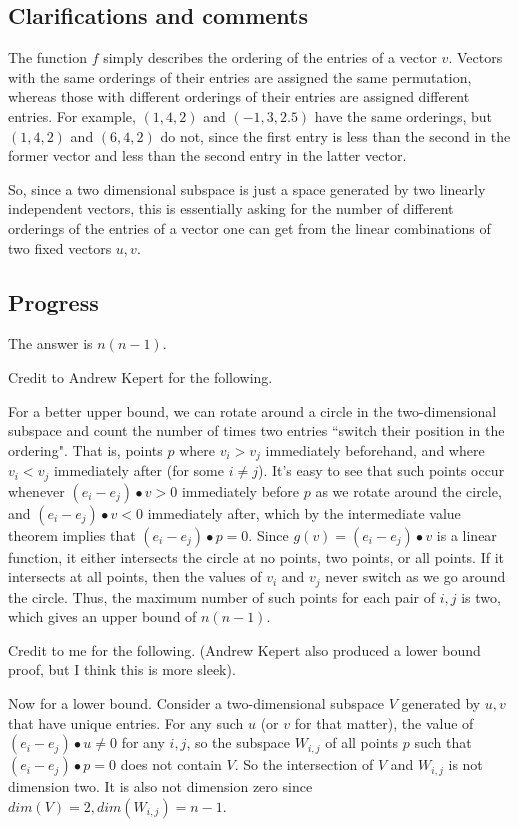 \documentclass[10pt]{article}
\begin{document}
\subsection{Clarifications and comments}

The function $f$ simply describes the ordering of the entries of a vector $v$. Vectors with the same orderings of their entries are assigned the same permutation, whereas those with different orderings of their entries are assigned different entries. For example, $(1,4,2)$ and $(-1,3,2.5)$ have the same orderings, but $(1,4,2)$ and $(6,4,2)$ do not, since the first entry is less than the second in the former vector and less than the second entry in the latter vector.

So, since a two dimensional subspace is just a space generated by two linearly independent vectors, this is essentially asking for the number of different orderings of the entries of a vector one can get from the linear combinations of two fixed vectors $u,v$.

\subsection{Progress}

The answer is $n(n-1)$.

Credit to Andrew Kepert for the following.

For a better upper bound, we can rotate around a circle in the two-dimensional subspace and count the number of times two entries ``switch their position in the ordering". That is, points $p$ where $v_i>v_j$ immediately beforehand, and where $v_i<v_j$ immediately after (for some $i\neq j$). It's easy to see that such points occur whenever $(e_i-e_j)\bullet v>0$ immediately before $p$ as we rotate around the circle, and $(e_i-e_j)\bullet v<0$ immediately after, which by the intermediate value theorem implies that $(e_i-e_j)\bullet p=0$. Since $g(v)=(e_i-e_j)\bullet v$ is a linear function, it either intersects the circle at no points, two points, or all points. If it intersects at all points, then the values of $v_i$ and $v_j$ never switch as we go around the circle. Thus, the maximum number of such points for each pair of $i,j$ is two, which gives an upper bound of $n(n-1)$.

Credit to me for the following. (Andrew Kepert also produced a lower bound proof, but I think this is more sleek).

Now for a lower bound. Consider a two-dimensional subspace $V$ generated by $u,v$ that have unique entries. For any such $u$ (or $v$ for that matter), the value of $(e_i-e_j)\bullet u\neq 0$ for any $i,j$, so the subspace $W_{i,j}$ of all points $p$ such that $(e_i-e_j)\bullet p=0$ does not contain $V$. So the intersection of $V$ and $W_{i,j}$ is not dimension two. It is also not dimension zero since $dim(V)=2,dim(W_{i,j})=n-1$.
\end{document}
